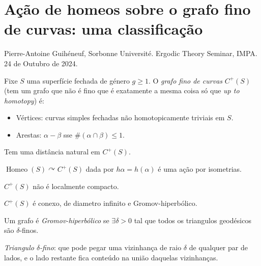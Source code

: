 \section{Ação de homeos sobre o grafo fino de
curvas: uma classificação}
\label{section-acao-homeos-grafo-fino}

\noindent
Pierre-Antoine Guihéneuf,
Sorbonne Université.
Ergodic Theory Seminar, IMPA.
24 de Outubro de 2024.

\medskip{}
Fixe $S$ uma superfície fechada de género
$g \geq 1$. O \textit{grafo fino de curvas}
$C^+(S)$ (tem um grafo que não é fino que é
exatamente a mesma coisa só que
\textit{up to homotopy}) é:
\begin{itemize}
\item Vértices: curvas simples fechadas não
homotopicamente triviais em $S$.
\item Arestas: $\alpha-\beta$ sse
$\#(\alpha\cap \beta)\leq 1$.
\end{itemize}
Tem uma distância natural em $C^+(S)$.

\begin{remark}
\label{remark-gh-isometries}
$\operatorname{Homeo}(S)\curvearrowright
C^+(S)$ dada por $h\alpha=h(\alpha)$ é uma
ação por isometrias.
\end{remark}

\begin{remark}
\label{remark-gh-not-compact}
$C^+(S)$ não é localmente compacto.
\end{remark}

\begin{theorem}
\label{theorem-gh-bhw21}
$C^+(S)$ é conexo, de diametro infinito e
Gromov-hiperbólico.
\end{theorem}

\begin{definition}
\label{definition-gh-hyperbolic}
Um grafo é \textit{Gromov-hiperbólico} se
$\exists \delta>0$ tal que todos os
triangulos geodésicos são $\delta$-finos.
\end{definition}

\begin{definition}
\label{definition-gh-thin-triangle}
\textit{Triangulo $\delta$-fino}: que pode
pegar uma vizinhança de raio $\delta $ de
qualquer par de lados, e o lado restante
fica conteúdo na união daquelas
vizinhanças.
\end{definition}

